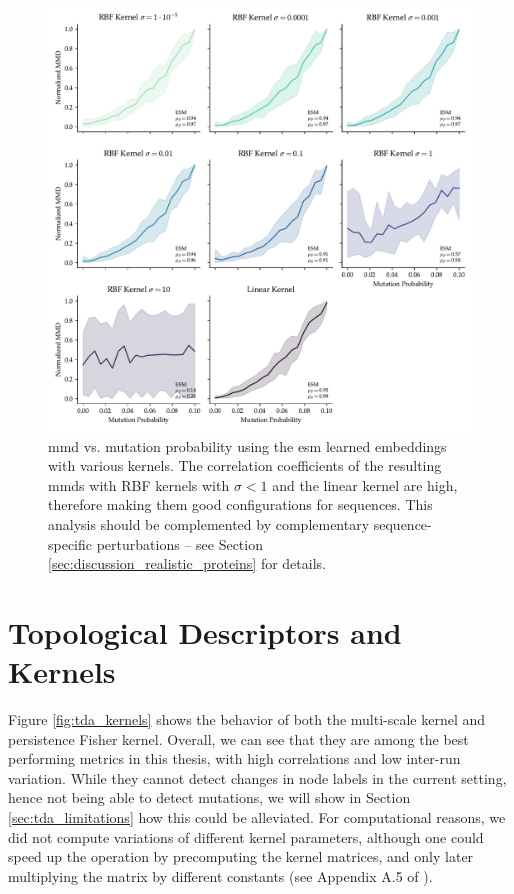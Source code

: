 \begin{figure}
  \centering
  \includegraphics[width=\textwidth]{./figures/results/res_5.pdf}
  \caption[\acrshort{mmd} using \acrshort{esm} embeddings.]{\acrshort{mmd} vs. mutation probability using the \acrshort{esm}
learned embeddings with various kernels. The correlation coefficients of the
resulting \acrshort{mmd}s with RBF kernels with $\sigma<1$ and the linear kernel are high,
therefore making them good configurations for sequences. This analysis should be
complemented by complementary sequence-specific perturbations -- see Section
\ref{sec:discussion_realistic_proteins} for details.}
  \label{fig:esm_descriptor}
\end{figure}


\section{Topological Descriptors and Kernels}\label{sec:results_topo_kernels}

Figure \ref{fig:tda_kernels} shows the behavior of both the multi-scale kernel
and persistence Fisher kernel. Overall, we can see that they are among the best
performing metrics in this thesis, with high correlations and low inter-run
variation. While they cannot detect changes in node labels in the current
setting, hence not being able to detect mutations, we will show in Section
\ref{sec:tda_limitations} how this could be alleviated. For computational
reasons, we did not compute variations of different kernel parameters, although
one could speed up the operation by precomputing the kernel matrices, and only
later multiplying the matrix by different constants (see Appendix A.5 of
\cite{obray2022evaluation}).

